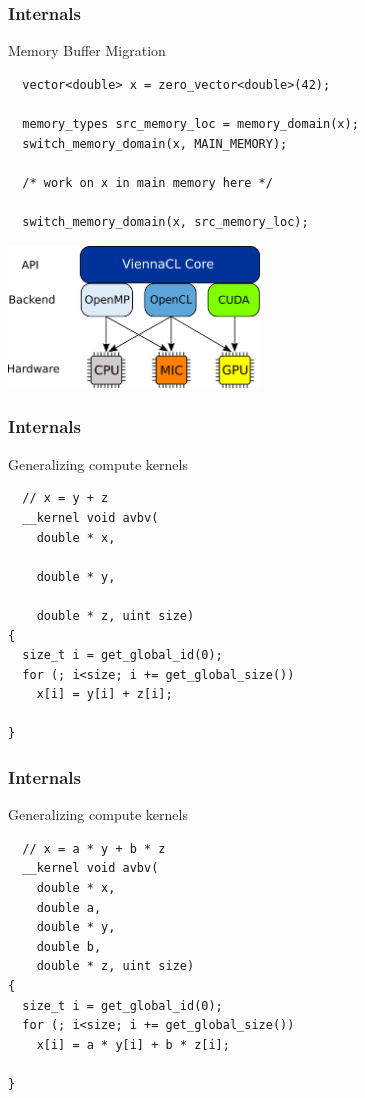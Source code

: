 \begin{frame}[fragile]
\frametitle{Internals}

 \begin{block}{Memory Buffer Migration}
  \begin{lstlisting}
  vector<double> x = zero_vector<double>(42);

  memory_types src_memory_loc = memory_domain(x);
  switch_memory_domain(x, MAIN_MEMORY);

  /* work on x in main memory here */

  switch_memory_domain(x, src_memory_loc);
\end{lstlisting}

  \begin{center}
    \includegraphics[width=0.5\textwidth]{figures/ViennaCL-arch.png}
  \end{center}
 \end{block}

\end{frame}




\begin{frame}[fragile]
\frametitle{Internals}

 \begin{block}{Generalizing compute kernels}
  \begin{lstlisting}
  // x = y + z
  __kernel void avbv(
    double * x,

    double * y,

    double * z, uint size)
{
  size_t i = get_global_id(0);
  for (; i<size; i += get_global_size())
    x[i] = y[i] + z[i]; 

}
  \end{lstlisting}
 \end{block}

 \vspace*{1.57cm}
\end{frame}



\begin{frame}[fragile]
\frametitle{Internals}

 \begin{block}{Generalizing compute kernels}
  \begin{lstlisting}
  // x = a * y + b * z
  __kernel void avbv(
    double * x,
    double a,
    double * y,
    double b,
    double * z, uint size)
{
  size_t i = get_global_id(0);
  for (; i<size; i += get_global_size())
    x[i] = a * y[i] + b * z[i]; 

}
  \end{lstlisting}
 \end{block}

 \vspace*{1.57cm}
\end{frame}


